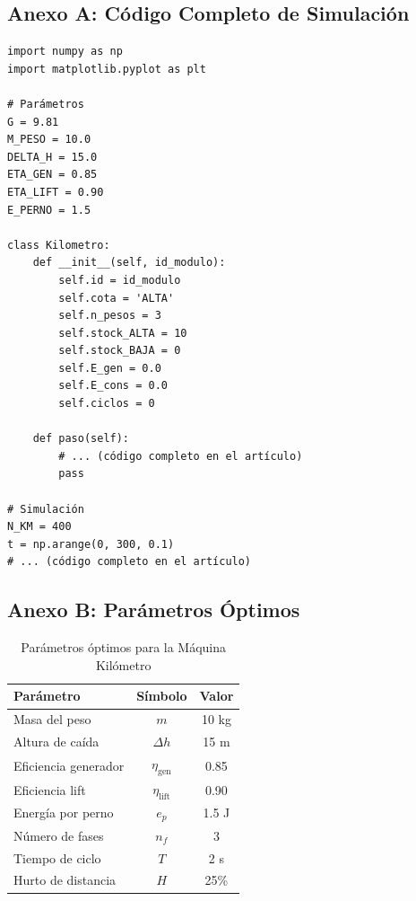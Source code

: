 \documentclass[12pt,a4paper]{article}
\begin{document}
\subsection{Anexo A: Código Completo de Simulación}

\begin{lstlisting}[style=python, caption={Simulación completa del enjambre de Kilómetros}]
import numpy as np
import matplotlib.pyplot as plt

# Parámetros
G = 9.81
M_PESO = 10.0
DELTA_H = 15.0
ETA_GEN = 0.85
ETA_LIFT = 0.90
E_PERNO = 1.5

class Kilometro:
    def __init__(self, id_modulo):
        self.id = id_modulo
        self.cota = 'ALTA'
        self.n_pesos = 3
        self.stock_ALTA = 10
        self.stock_BAJA = 0
        self.E_gen = 0.0
        self.E_cons = 0.0
        self.ciclos = 0
        
    def paso(self):
        # ... (código completo en el artículo)
        pass

# Simulación
N_KM = 400
t = np.arange(0, 300, 0.1)
# ... (código completo en el artículo)
\end{lstlisting}

\subsection{Anexo B: Parámetros Óptimos}

\begin{table}[H]
\centering
\caption{Parámetros óptimos para la Máquina Kilómetro}
\label{tab:parametros}
\begin{tabular}{@{}lcc@{}}
\toprule
\textbf{Parámetro} & \textbf{Símbolo} & \textbf{Valor} \\
\midrule
Masa del peso & $m$ & 10 kg \\
Altura de caída & $\Delta h$ & 15 m \\
Eficiencia generador & $\eta_{\text{gen}}$ & 0.85 \\
Eficiencia lift & $\eta_{\text{lift}}$ & 0.90 \\
Energía por perno & $e_p$ & 1.5 J \\
Número de fases & $n_f$ & 3 \\
Tiempo de ciclo & $T$ & 2 s \\
Hurto de distancia & $H$ & 25\% \\
\bottomrule
\end{tabular}
\end{table}

\end{document}

